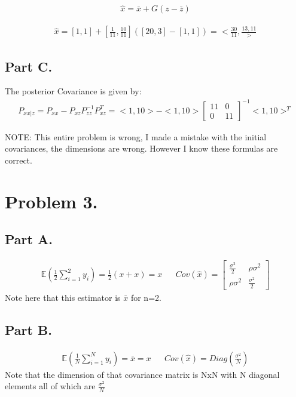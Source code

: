 \documentclass{article}
\begin{document}
\begin{align*}
\hat{x} = \bar{x} + G (z-\bar{z})
\end{align*}


\begin{align*}
\hat{x} = [1,1] + [\frac{1}{11},\frac{10}{11}] ([20,3] - [1,1]) = <\frac{30}{11}, \frac{13,11}>
\end{align*}

\subsection*{Part C.}
The posterior Covariance is given by:
\begin{align*}
P_{xx|z} = P_{xx} - P_{xz}P_{zz}^{-1}P_{xz}^T = <1,10> - <1,10> \begin{bmatrix}
                                        11 & 0 \\
                                         0 & 11
                                        \end{bmatrix}^{-1} <1,10>^T
\end{align*}


NOTE: This entire problem is wrong, I made a mistake with the initial covariances, the dimensions are wrong. However I know these formulas are correct.


\clearpage
\section*{Problem 3.}
\subsection*{Part A.}
\begin{align*}
\mathbb{E}(\frac{1}{2}\sum_{i=1}^{2} y_i) = \frac{1}{2} (x+x) = x && Cov(\hat{x}) = \begin{bmatrix}
                                        											\frac{\sigma^2}{2} & \rho \sigma^2\\
                                         											\rho \sigma^2 & \frac{\sigma^2}{2}
                                        											\end{bmatrix}
\end{align*}
Note here that this estimator is $\bar{x}$ for n=2.
\subsection*{Part B.}
\begin{align*}
\mathbb{E}(\frac{1}{N}\sum_{i=1}^{N} y_i) = \bar{x} = x && Cov(\hat{x}) = Diag(\frac{\sigma^2}{N})
\end{align*}
Note that the dimension of that covariance matrix is NxN with N diagonal elements all of which are $\frac{\sigma^2}{N}$
\end{document}
